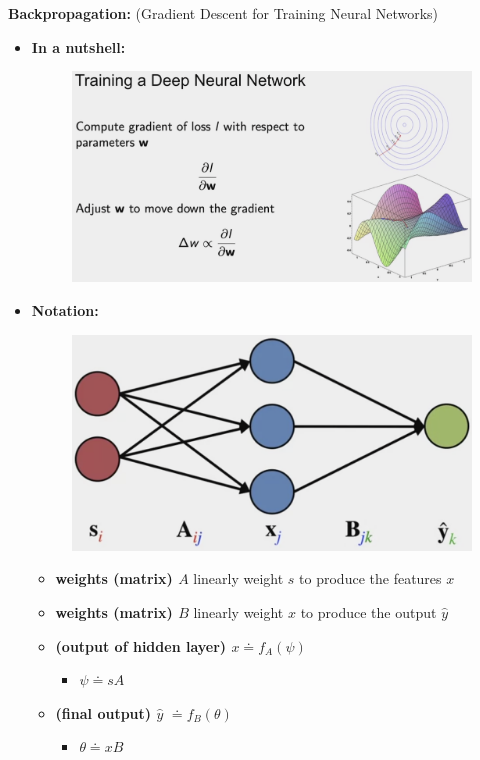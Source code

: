 \documentclass[12pt, a4paper]{article}
\begin{document}
\textbf{Backpropagation:} (Gradient Descent for Training Neural Networks)
\begin{itemize}

  \item \textbf{In a nutshell:}
  \begin{figure}[H]
    \centering
      \includegraphics[width=0.9\columnwidth]{images/training-nn.png}
      \label{fig:training-nn}
  \end{figure}

  \item \textbf{Notation:}
  \begin{figure}[H]
    \centering
      \includegraphics[width=0.5\columnwidth]{images/ann-notation.png}
      \label{fig:ann-notation}
  \end{figure}
  \begin{itemize}
    \item \textbf{weights (matrix) $A$} linearly weight $s$ to produce the features $x$
    \item \textbf{weights (matrix) $B$} linearly weight $x$ to produce the output $\hat{y}$
    \item \textbf{(output of hidden layer) $x$}$ \doteq f_A(\psi)$
    \begin{itemize}
      \item $\psi \doteq sA$
    \end{itemize}
    \item \textbf{(final output) $\hat{y}$} $\doteq f_B(\theta)$
    \begin{itemize}
      \item $\theta \doteq xB$
    \end{itemize}
  \end{itemize}



\end{itemize}
\end{document}
